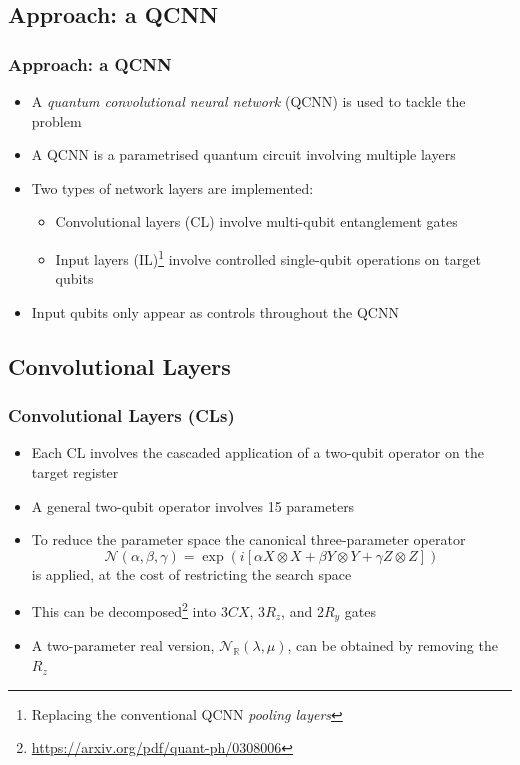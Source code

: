\documentclass{beamer}
\begin{document}
\begin{frame}
\section{Approach: a QCNN}
\frametitle{Approach: a QCNN}
\begin{itemize}
\item A \emph{quantum convolutional neural network} (\alert{QCNN}) is used to tackle the problem
\item A QCNN is a parametrised quantum circuit involving multiple \alert{layers}
\item Two types of network layers are implemented:
\begin{itemize}
\item \alert{Convolutional layers (CL)} involve multi-qubit entanglement gates 
\item \alert{Input layers (IL)}\footnote{Replacing the conventional QCNN \emph{pooling layers}} involve controlled single-qubit operations on target qubits 
\end{itemize}
\item Input qubits only appear as controls throughout the QCNN
\end{itemize}
\end{frame}
 
\begin{frame}
\subsection{Convolutional Layers}
\frametitle{Convolutional Layers (CLs)}
\begin{itemize}
\item Each CL involves the cascaded application of a \alert{two-qubit operator} on the target register 
\item A general two-qubit operator involves 15 parameters
\item To reduce the parameter space the canonical \alert{three-parameter operator} 
\begin{equation}
\mathcal{N}(\alpha, \beta, \gamma) = \exp \left( i \left[ \alpha X \otimes X + \beta Y \otimes Y + \gamma Z \otimes Z \right] \right)
\end{equation}
is applied, at the cost of restricting the search space 
\item This can be decomposed\footnote{\url{https://arxiv.org/pdf/quant-ph/0308006}} into 3$CX$, 3$R_z$, and 2$R_y$ gates
\item A two-parameter real version, $\mathcal{N}_\mathbb{R}(\lambda, \mu)$, can be obtained by removing the $R_z$
\end{itemize}
\end{frame} 
\end{document}

